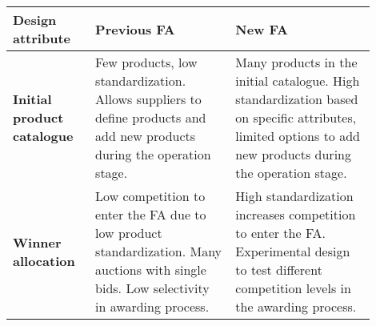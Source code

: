 \begin{tabular}{p{0.2\linewidth}|p{0.35\linewidth}p{0.35\linewidth}}

 Design attribute & Previous FA  & New FA \\
 \hline
\textbf{Initial product catalogue}
    & Few products, low standardization.  Allows suppliers to define products and add new products during the operation stage.
    & Many products in the initial catalogue. High standardization based on specific attributes, limited options to add new products during the operation stage.
    \\
    \hline

\textbf{Winner allocation}
    & Low competition to enter the FA due to low product standardization. Many auctions with single bids. {Low selectivity in awarding process.}
    & High standardization increases competition to enter the FA. {Experimental design to test different competition levels in the awarding process.}
    \\
    \hline
    

\end{tabular}
